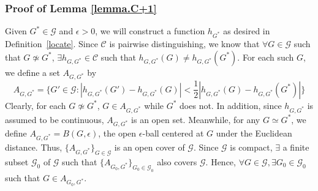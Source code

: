 \documentclass{article}
\def\Gfun{\mathcal{G}}
\begin{document}
\subsubsection{Proof of Lemma \ref{lemma.C+1}}
Given $G^* \in \Gfun$ and $\epsilon > 0$, we will construct a function $h_{G^*}$ as desired in Definition~\ref{locate}. Since $\mathcal{C}$ is pairwise distinguishing, we know that $\forall G \in \Gfun$ such that $G \not\simeq G^*$, $\exists h_{G, G^*} \in \mathcal{C}$ such that $h_{G, G^*}(G) \neq h_{G, G^*}(G^*)$. For each such $G$, we define a set $A_{G, G^*}$ by
\begin{equation*}
A_{G, G^*} = \{ G' \in \Gfun : \left | h_{G, G^*}(G') - h_{G, G^*}(G) \right | < \frac{1}{2} |h_{G, G^*}(G) - h_{G, G^*}(G^*)| \}
\end{equation*}
Clearly, for each $G \not\simeq G^*$, $G \in A_{G, G^*}$ while $G^*$ does not. In addition, since $h_{G, G^*}$ is assumed to be continuous, $A_{G, G^*}$ is an open set. Meanwhile, for any $G \simeq G^*$, we define $A_{G, G^*} = B(G, \epsilon)$, the open $\epsilon$-ball centered at $G$ under the Euclidean distance. Thus, $\{ A_{G, G^*} \}_{G \in \Gfun}$ is an open cover of $\Gfun$. Since $\Gfun$ is compact, $\exists$ a finite subset $\Gfun_0$ of $\Gfun$ such that $\{ A_{G_0, G^*} \}_{G_0 \in \Gfun_0}$ also covers $\Gfun$. 
Hence, $\forall G \in \Gfun, \exists G_0 \in \Gfun_0$ such that $G \in A_{G_0, G^*}$. 
\end{document}
